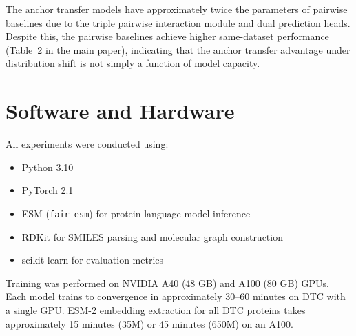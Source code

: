 \documentclass[11pt]{article}
\begin{document}
The anchor transfer models have approximately twice the parameters of pairwise baselines due to the triple pairwise interaction module and dual prediction heads. Despite this, the pairwise baselines achieve higher same-dataset performance (Table~2 in the main paper), indicating that the anchor transfer advantage under distribution shift is not simply a function of model capacity.

\section{Software and Hardware}
\label{sec:software}

All experiments were conducted using:
\begin{itemize}
    \item Python 3.10
    \item PyTorch 2.1
    \item ESM (\texttt{fair-esm}) for protein language model inference
    \item RDKit for SMILES parsing and molecular graph construction
    \item scikit-learn for evaluation metrics
\end{itemize}

Training was performed on NVIDIA A40 (48 GB) and A100 (80 GB) GPUs. Each model trains to convergence in approximately 30--60 minutes on DTC with a single GPU. ESM-2 embedding extraction for all DTC proteins takes approximately 15 minutes (35M) or 45 minutes (650M) on an A100.
\end{document}
